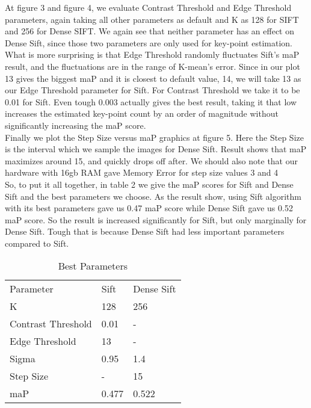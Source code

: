 \documentclass[conference,compsoc]{IEEEtran}
\begin{document}
At figure 3 and figure 4, we evaluate Contrast Threshold and Edge Threshold parameters, again taking all other parameters as default and K as 128 for SIFT and 256 for Dense SIFT. We again see that neither parameter has an effect on Dense Sift, since those two parameters are only used for key-point estimation. What is more surprising is that Edge Threshold randomly fluctuates Sift's maP result, and the fluctuations are in the range of K-mean's error. Since in our plot 13 gives the biggest maP and it is closest to default value, 14, we will take 13 as our Edge Threshold parameter for Sift. For Contrast Threshold we take it to be 0.01 for Sift.  Even tough 0.003 actually gives the best result, taking it that low increases the estimated key-point count by an order of magnitude without significantly increasing the maP score.\\

Finally we plot the Step Size versus maP graphics at figure 5. Here the Step Size is the interval which we sample the images for Dense Sift. Result shows that maP maximizes around 15, and quickly drops off after. We should also note that our hardware with 16gb RAM gave Memory Error for step size values 3 and 4 \\

So, to put it all together, in table 2 we give the maP scores for Sift and Dense Sift and the best parameters we choose. As the result show, using Sift algorithm with its best parameters gave us 0.47 maP score while Dense Sift gave us 0.52 maP score. So the result is increased significantly for Sift, but only marginally for Dense Sift. Tough that is because Dense Sift had less important parameters compared to Sift.\\

\begin{table}[]
\centering

\label{my-label}
\begin{tabular}{lll}
Parameter          & Sift  & Dense Sift \\
K                  & 128   & 256        \\
Contrast Threshold & 0.01  & -          \\
Edge Threshold     & 13    & -          \\
Sigma              & 0.95  & 1.4        \\
Step Size          & -     & 15         \\
maP                & 0.477 & 0.522     
\end{tabular}
\caption{Best Parameters}
\end{table}
\end{document}
